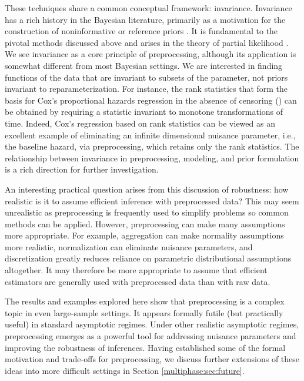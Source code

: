 These techniques share a common conceptual framework: invariance.
Invariance has a rich history in the Bayesian literature, primarily as a motivation for the construction of noninformative or reference priors \citep[e.g.,][]{Jeffreys1946,Hartigan1964,Geisser1979,Berger1992,Kass1996}.
It is fundamental to the pivotal methods discussed above and arises in the theory of partial likelihood \citep{Cox1975}.
We see invariance as a core principle of preprocessing, although its application is somewhat different from most Bayesian settings.
We are interested in finding functions of the data that are invariant to subsets of the parameter, not priors invariant to reparameterization. 
For instance, the rank statistics that form the basis for Cox's proportional hazards regression in the absence of censoring (\citeyear{Cox1972}) can be obtained by requiring a statistic invariant to monotone transformations of time.
Indeed, Cox's regression based on rank statistics can be viewed as an excellent example of eliminating an infinite dimensional nuisance parameter, i.e., the baseline hazard, via preprocessing, which retains only the rank statistics.
The relationship between invariance in preprocessing, modeling, and prior formulation is a rich direction for further investigation.

An interesting practical question arises from this discussion of robustness: how realistic is it to assume efficient inference with preprocessed data?
This may seem unrealistic as preprocessing is frequently used to simplify problems so common methods can be applied.
However, preprocessing can make many assumptions more appropriate.
For example, aggregation can make normality assumptions more realistic, normalization can eliminate nuisance parameters, and discretization greatly reduces reliance on parametric distributional assumptions altogether.
It may therefore be more appropriate to assume that efficient estimators are generally used with preprocessed data than with raw data.

The results and examples explored here show that preprocessing is a complex topic in even large-sample settings.
It appears formally futile (but practically useful) in standard asymptotic regimes. Under other realistic asymptotic regimes, preprocessing emerges as a powerful tool for addressing nuisance parameters and improving the robustness of inferences.
Having established some of the formal motivation and trade-offs for preprocessing, we discuss further extensions of these ideas into more difficult settings in Section \ref{multiphase:sec:future}.

